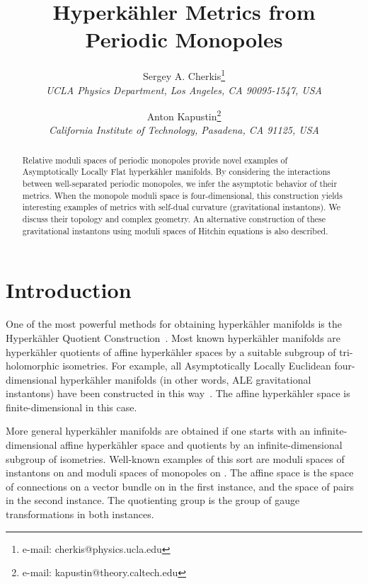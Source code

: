\documentclass[a4paper,12pt, amsfonts, amssymb]{article}
\title{\bf Hyperk\"ahler Metrics from\\ Periodic Monopoles}
\author{
Sergey A. Cherkis\thanks{e-mail: cherkis@physics.ucla.edu}\\
\it UCLA Physics Department, Los Angeles, CA 90095-1547, USA
 \rm
\and
Anton Kapustin\thanks{e-mail: kapustin@theory.caltech.edu}\\
\it California Institute of Technology, Pasadena, CA 91125, USA
}
\providecommand{\RR}{{\mathbb R}}
\begin{document}
\begin{titlepage}

\renewcommand{\thepage}{ }
\date{}

\maketitle

\begin{abstract}
Relative moduli spaces of periodic monopoles provide novel examples of Asymptotically Locally Flat hyperk\"ahler manifolds. By considering the interactions between well-separated periodic monopoles, we infer the
asymptotic behavior of their metrics. When the monopole moduli space is
four-dimensional, this construction yields interesting examples of metrics
with self-dual curvature (gravitational instantons).
We discuss their topology and complex geometry.
An alternative construction of these gravitational instantons using moduli spaces of Hitchin equations is also described.


\end{abstract}
\vspace{-5.5in}

\parbox{\linewidth}
{\small\hfill {}}

\end{titlepage}
\pagestyle{headings}

\section{Introduction}

One of the most powerful methods for obtaining hyperk\"ahler manifolds is the
Hyperk\"ahler Quotient Construction~\cite{HKLR}. Most known hyperk\"ahler
manifolds are hyperk\"ahler quotients of affine hyperk\"ahler spaces by a suitable subgroup of tri-holomorphic isometries. For example, all Asymptotically Locally Euclidean four-dimensional hyperk\"ahler manifolds (in other words, ALE gravitational instantons) have been constructed in this way~\cite{Kr}. The affine hyperk\"ahler space is finite-dimensional in
this case.

More general hyperk\"ahler manifolds are obtained if one starts with an
infinite-dimensional affine hyperk\"ahler space and quotients by an
infinite-dimensional subgroup of isometries. Well-known examples
of this sort are moduli spaces of instantons on \myHighlight{$\RR^4$}\coordHE{}
and moduli spaces of monopoles on \myHighlight{$\RR^3$}\coordHE{}. The affine space is the space
of connections on a vector bundle on \myHighlight{$\RR^4$}\coordHE{} in the first instance, and the space of pairs \coordHE{} in the second instance. The quotienting group is the group of gauge transformations in both instances.
\end{document}
